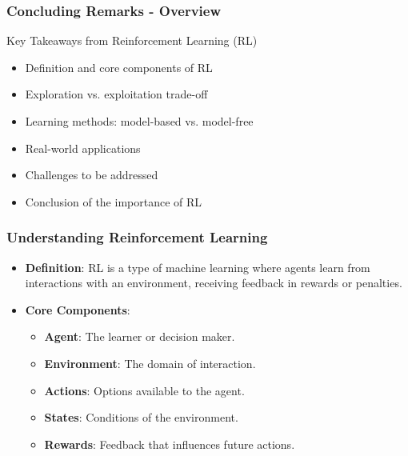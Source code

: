 \documentclass[aspectratio=169]{beamer}
\begin{document}
\begin{frame}[fragile]
    \frametitle{Concluding Remarks - Overview}
    \begin{block}{Key Takeaways from Reinforcement Learning (RL)}
        \begin{itemize}
            \item Definition and core components of RL
            \item Exploration vs. exploitation trade-off
            \item Learning methods: model-based vs. model-free
            \item Real-world applications
            \item Challenges to be addressed
            \item Conclusion of the importance of RL
        \end{itemize}
    \end{block}
\end{frame}

\begin{frame}[fragile]
    \frametitle{Understanding Reinforcement Learning}
    \begin{itemize}
        \item \textbf{Definition}: 
        RL is a type of machine learning where agents learn from interactions with an environment, receiving feedback in rewards or penalties.
        
        \item \textbf{Core Components}:
        \begin{itemize}
            \item \textbf{Agent}: The learner or decision maker.
            \item \textbf{Environment}: The domain of interaction.
            \item \textbf{Actions}: Options available to the agent.
            \item \textbf{States}: Conditions of the environment.
            \item \textbf{Rewards}: Feedback that influences future actions.
        \end{itemize}
    \end{itemize}
\end{frame}
\end{document}
